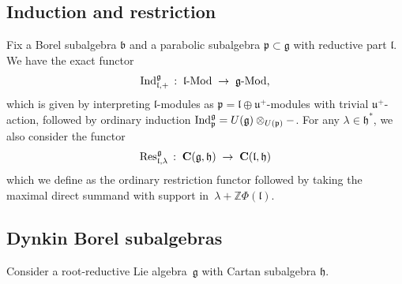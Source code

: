 \documentclass[11pt]{amsart}
\newcommand{\rR}{\Phi}
\newcommand{\bC}{\mathbf{C}}
\newcommand{\fg}{\mathfrak{g}}
\newcommand{\fp}{\mathfrak{p}}
\newcommand{\fl}{\mathfrak{l}}
\newcommand{\fu}{\mathfrak{u}}
\newcommand{\fh}{\mathfrak{h}}
\newcommand{\fb}{\mathfrak{b}}
\newcommand{\mZ}{\mathbb{Z}}
\numberwithin{equation}{section}
\theoremstyle{plain}
\theoremstyle{remark}
\theoremstyle{remark}
\theoremstyle{construction}
\newcommand{\ind}{{\rm Ind}}
\newcommand{\res}{{\rm Res}}
\begin{document}
\subsection{Induction and restriction}\label{IndRes}
Fix a Borel subalgebra $\fb$ and a parabolic subalgebra $\fp\subset\fg$ with reductive part $\fl$. We have the exact functor
$$\ind^{\fg}_{\fl,+}\,:\; \fl\mbox{-Mod}\;\to\;\fg\mbox{-Mod,}$$
which is given by interpreting $\fl$-modules as $\fp=\fl\oplus \fu^+$-modules with trivial $\fu^{+}$-action, followed by ordinary induction $\ind^{\fg}_{\fp}=U(\fg)\otimes_{U(\fp)}-$.
For any $\lambda\in\fh^\ast$, we also consider {the functor}
$$\res^{\fg}_{\fl,\lambda}\,:\; \bC(\fg,\fh)\;\to\; \bC(\fl,\fh)$$
{which we define as} the ordinary restriction functor followed by taking the maximal direct summand with support in~$\lambda+\mZ\rR(\fl)$.




\subsection{Dynkin Borel subalgebras}
Consider a root-reductive Lie algebra~$\fg$ with Cartan subalgebra $\fh$.
\end{document}
